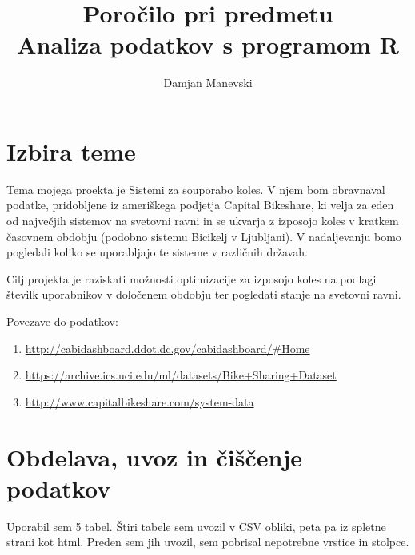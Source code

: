 \documentclass[11pt,a4paper]{article}
\begin{document}
\title{Poročilo pri predmetu \\
Analiza podatkov s programom R}
\author{Damjan Manevski}
\maketitle

\section{Izbira teme}

  Tema mojega proekta je Sistemi za souporabo koles. V njem bom obravnaval podatke, pridobljene iz ameriškega podjetja Capital Bikeshare, ki velja za eden od največjih sistemov na svetovni ravni in se ukvarja z izposojo koles v kratkem časovnem obdobju (podobno sistemu Bicikelj v Ljubljani). V nadaljevanju bomo pogledali koliko se uporabljajo te sisteme v različnih državah. 
  
  Cilj projekta je raziskati možnosti optimizacije za izposojo koles na podlagi številk  uporabnikov v določenem obdobju ter pogledati stanje na svetovni ravni.
  
  Povezave do podatkov:
  
\begin{enumerate}

\item{\url{http://cabidashboard.ddot.dc.gov/cabidashboard/#Home}}

\item{\url{https://archive.ics.uci.edu/ml/datasets/Bike+Sharing+Dataset}}

\item{\url{http://www.capitalbikeshare.com/system-data}}

\end{enumerate}

\section{Obdelava, uvoz in čiščenje podatkov}

Uporabil sem 5 tabel. Štiri tabele sem uvozil v CSV obliki, peta pa iz spletne strani kot html. Preden sem jih uvozil, sem pobrisal nepotrebne vrstice in stolpce.
\end{document}
